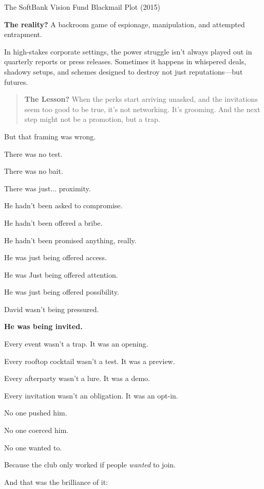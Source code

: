 \begin{HistoricalSidebar}{The SoftBank Vision Fund Blackmail Plot (2015)}
  \medskip
  
  \textbf{The reality?} A backroom game of espionage, manipulation, and attempted entrapment.
  
  \medskip
  
  In high-stakes corporate settings, the power struggle isn’t always played out in quarterly 
  reports or press releases. Sometimes it happens in whispered deals, shadowy setups, and 
  schemes designed to destroy not just reputations—but futures.
  
  \begin{quote}
  \textbf{The Lesson?} When the perks start arriving unasked, and the invitations seem too good 
  to be true, it’s not networking. It’s grooming. And the next step might not be a promotion, 
  but a trap.
  \end{quote}
  
\end{HistoricalSidebar}

\medskip

But that framing was wrong.

There was no test.

There was no bait.

There was just... proximity.

He hadn’t been asked to compromise.

He hadn’t been offered a bribe.

He hadn’t been promised anything, really.

He was just being offered access.

He was Just being offered attention.

He was just being offered possibility.

David wasn't being pressured. 

\textbf{He was being invited.}

Every event wasn’t a trap. It was an opening.

Every rooftop cocktail wasn’t a test. It was a preview.  

Every afterparty wasn’t a lure. It was a demo.  

Every invitation wasn’t an obligation. It was an opt-in.

No one pushed him. 

No one coerced him. 

No one wanted to. 

Because the club only worked if people \textit{wanted} to join.

And that was the brilliance of it:

